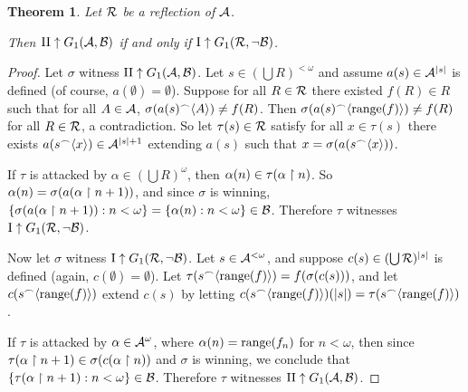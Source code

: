 \documentclass{amsart}
\theoremstyle{plain}
\newtheorem{theorem}{Theorem}
\theoremstyle{definition}
\theoremstyle{remark}
\theoremstyle{plain}
\theoremstyle{definition}
\theoremstyle{remark}
\begin{document}
\begin{theorem}
  Let \(\mathcal{R}\) be a reflection of \(\mathcal{A}\). 

  Then
  \(\mathrm{II}\uparrow G_{1}(\mathcal{A},\mathcal{B})\) if and only if
  \(\mathrm{I}\uparrow G_{1}(\mathcal{R},\neg\mathcal{B})\).
\end{theorem}

\begin{proof}
  Let \(\sigma\) witness 
  \(\mathrm{II}\uparrow G_{1}(\mathcal{A},\mathcal{B})\).
  Let \(s\in(\bigcup R)^{<\omega}\) and assume \(a(s)\in\mathcal{A}^{|s|}\) is defined
  (of course, \(a(\emptyset)=\emptyset\)).
  Suppose for all \(R\in\mathcal{R}\) there existed \(f(R)\in R\) such that for all
  \(A\in\mathcal{A}\), \(\sigma(a(s){^\frown}\langle A\rangle)\not=f(R)\). Then 
  \(\sigma(a(s){^\frown}\langle\text{range}(f)\rangle)\not=f(R)\) for all \(R\in\mathcal{R}\), a contradiction.
  So let \(\tau(s)\in\mathcal{R}\) satisfy for all \(x\in\tau(s)\) there exists
  \(a(s{^\frown}\langle x\rangle)\in\mathcal{A}^{|s|+1}\) extending \(a(s)\) such that 
  \(x=\sigma(a(s{^\frown}\langle x\rangle))\).

  If \(\tau\) is attacked by \(\alpha\in(\bigcup R)^\omega\), then 
  \(\alpha(n)\in\tau(\alpha\restriction n)\). So \(\alpha(n)=\sigma(a(\alpha\restriction n+1))\),
  and since \(\sigma\) is winning, 
  \(\{\sigma(a(\alpha\restriction n+1)):n<\omega\}=\{\alpha(n):n<\omega\}\in\mathcal{B}\).
  Therefore \(\tau\) witnesses
  \(\mathrm{I}\uparrow G_{1}(\mathcal{R},\neg\mathcal{B})\).

  Now let \(\sigma\) witness
  \(\mathrm{I}\uparrow G_{1}(\mathcal{R},\neg\mathcal{B})\).
  Let \(s\in\mathcal{A}^{<\omega}\), and suppose \(c(s)\in(\bigcup \mathcal{R})^{|s|}\) is defined
  (again, \(c(\emptyset)=\emptyset\)). Let \(\tau(s{^\frown}\langle\text{range}(f)\rangle)=f(\sigma(c(s)))\),
  and let \(c(s{^\frown}\langle\text{range}(f)\rangle)\) extend \(c(s)\) by letting
  \(c(s{^\frown}\langle\text{range}(f)\rangle)(|s|)=\tau(s{^\frown}\langle\text{range}(f)\rangle)\).

  If \(\tau\) is attacked by \(\alpha\in\mathcal{A}^\omega\), where \(\alpha(n)=\text{range}(f_n)\)
  for \(n<\omega\), then since \(\tau(\alpha\restriction n+1)\in\sigma(c(\alpha\restriction n))\)
  and \(\sigma\) is winning, we conclude that 
  \(\{\tau(\alpha\restriction n+1):n<\omega\}\in\mathcal{B}\).
  Therefore \(\tau\) witnesses
  \(\mathrm{II}\uparrow G_{1}(\mathcal{A},\mathcal{B})\).
\end{proof}



\end{document}
